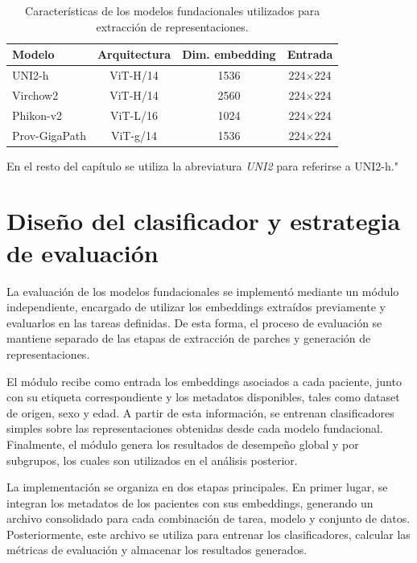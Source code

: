 \begin{table}[h]
\centering
\caption{Características de los modelos fundacionales utilizados para extracción de representaciones.}
\label{tab:modelos-embedding}
\begin{tabular}{lccc}
\hline
\textbf{Modelo} & \textbf{Arquitectura} & \textbf{Dim. embedding} & \textbf{Entrada} \\
\hline
UNI2-h        & ViT-H/14 & 1536 & 224$\times$224 \\
Virchow2      & ViT-H/14 & 2560 & 224$\times$224 \\
Phikon-v2     & ViT-L/16 & 1024 & 224$\times$224 \\
Prov-GigaPath & ViT-g/14 & 1536 & 224$\times$224 \\
\hline
\end{tabular}
\end{table}

En el resto del capítulo se utiliza la abreviatura \textit{UNI2} para referirse a UNI2-h."

\section{Diseño del clasificador y estrategia de evaluación}
\label{sec:diseno-clasificador}

La evaluación de los modelos fundacionales se implementó mediante un módulo
independiente, encargado de utilizar los embeddings extraídos previamente y
evaluarlos en las tareas definidas. De esta forma, el proceso de evaluación
se mantiene separado de las etapas de extracción de parches y generación de
representaciones.

El módulo recibe como entrada los embeddings asociados a cada paciente, junto
con su etiqueta correspondiente y los metadatos disponibles, tales como
dataset de origen, sexo y edad. A partir de esta información, se entrenan
clasificadores simples sobre las representaciones obtenidas desde cada modelo
fundacional. Finalmente, el módulo genera los resultados de desempeño global
y por subgrupos, los cuales son utilizados en el análisis posterior.

La implementación se organiza en dos etapas principales. En primer lugar, se
integran los metadatos de los pacientes con sus embeddings, generando un
archivo consolidado para cada combinación de tarea, modelo y conjunto de datos. Posteriormente,
este archivo se utiliza para entrenar los clasificadores, calcular las
métricas de evaluación y almacenar los resultados generados.

